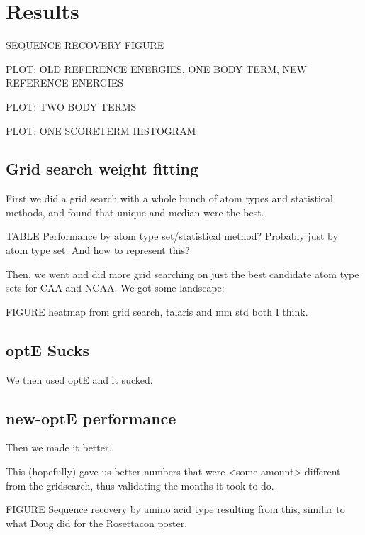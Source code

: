 \section{Results}
SEQUENCE RECOVERY FIGURE

PLOT: OLD REFERENCE ENERGIES, ONE BODY TERM, NEW REFERENCE ENERGIES

PLOT: TWO BODY TERMS

PLOT: ONE SCORETERM HISTOGRAM


\subsection{Grid search weight fitting}
First we did a grid search with a whole bunch of atom types and statistical methods, and found that unique and median were the best.

TABLE Performance by atom type set/statistical method? Probably just by atom type set. And how to represent this?

Then, we went and did more grid searching on just the best candidate atom type sets for CAA and NCAA. We got some landscape:

FIGURE heatmap from grid search, talaris and mm std both I think.


\subsection{optE Sucks}
We then used optE and it sucked.

\subsection{new-optE performance}
Then we made it better. 

This (hopefully) gave us better numbers that were <some amount> different from the gridsearch, thus validating the months it took to do.


FIGURE Sequence recovery by amino acid type resulting from this, similar to what Doug did for the Rosettacon poster.
